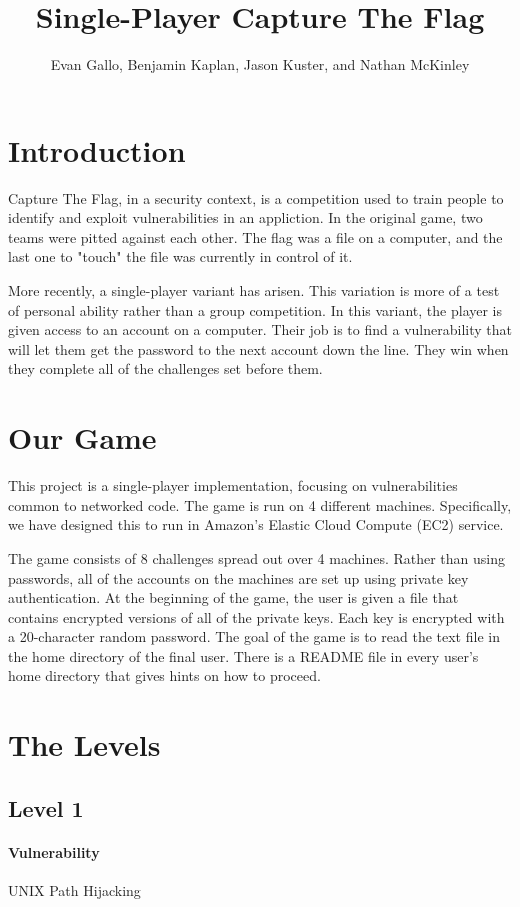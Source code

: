 \documentclass[12pt]{article}
\title{Single-Player Capture The Flag}
\author{Evan Gallo, Benjamin Kaplan, Jason Kuster, and Nathan McKinley}
\begin{document}
\maketitle
\tableofcontents
\section{Introduction}
Capture The Flag, in a security context, is a competition used to train people
to identify and exploit vulnerabilities in an appliction. In the original game,
two teams were pitted against each other. The flag was a file on a computer,
and the last one to "touch" the file was currently in control of it.

More recently, a single-player variant has arisen. This variation is more of a
test of personal ability rather than a group competition. In this variant, the
player is given access to an account on a computer. Their job is to find a
vulnerability that will let them get the password to the next account down the
line. They win when they complete all of the challenges set before them.

\section{Our Game}
This project is a single-player implementation, focusing on vulnerabilities
common to networked code. The game is run on 4 different machines.
Specifically, we have designed this to run in Amazon's Elastic Cloud Compute
(EC2) service.

The game consists of 8 challenges spread out over 4 machines. Rather than using
passwords, all of the accounts on the machines are set up using private key
authentication. At the beginning of the game, the user is given a file that
contains encrypted versions of all of the private keys. Each key is encrypted
with a 20-character random password. The goal of the game is to read the text
file in the home directory of the final user. There is a README file in every
user's home directory that gives hints on how to proceed. 

\section{The Levels}

\subsection{Level 1}
\paragraph{Vulnerability} UNIX Path Hijacking
\end{document}

